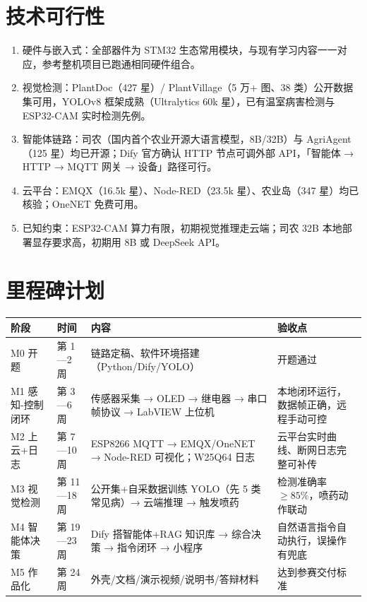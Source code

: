 \documentclass[11pt]{ctexart}
\begin{document}
\section{技术可行性}
\begin{enumerate}
  \item 硬件与嵌入式：全部器件为 STM32 生态常用模块，与现有学习内容一一对应，参考整机项目已跑通相同硬件组合。
  \item 视觉检测：PlantDoc（427 星）/ PlantVillage（5 万+ 图、38 类）公开数据集可用，YOLOv8 框架成熟（Ultralytics 60k 星），已有温室病害检测与 ESP32-CAM 实时检测先例。
  \item 智能体链路：司农（国内首个农业开源大语言模型，8B/32B）与 AgriAgent（125 星）均已开源；Dify 官方确认 HTTP 节点可调外部 API，「智能体 → HTTP → MQTT 网关 → 设备」路径可行。
  \item 云平台：EMQX（16.5k 星）、Node-RED（23.5k 星）、农业岛（347 星）均已核验；OneNET 免费可用。
  \item 已知约束：ESP32-CAM 算力有限，初期视觉推理走云端；司农 32B 本地部署显存要求高，初期用 8B 或 DeepSeek API。
\end{enumerate}

\section{里程碑计划}
\begin{longtable}{p{2.0cm}p{1.5cm}p{7.0cm}p{4.1cm}}
  \toprule
  阶段 & 时间 & 内容 & 验收点 \\
  \midrule
  M0 开题 & 第 1—2 周 & 链路定稿、软件环境搭建（Python/Dify/YOLO） & 开题通过 \\
  M1 感知-控制闭环 & 第 3—6 周 & 传感器采集 → OLED → 继电器 → 串口帧协议 → LabVIEW 上位机 & 本地闭环运行，数据帧正确，远程手动可控 \\
  M2 上云+日志 & 第 7—10 周 & ESP8266 MQTT → EMQX/OneNET → Node-RED 可视化；W25Q64 日志 & 云平台实时曲线、断网日志完整可补传 \\
  M3 视觉检测 & 第 11—18 周 & 公开集+自采数据训练 YOLO（先 5 类常见病）→ 云端推理 → 触发喷药 & 检测准确率 $\geq 85\%$，喷药动作联动 \\
  M4 智能体决策 & 第 19—23 周 & Dify 搭智能体+RAG 知识库 → 综合决策 → 指令闭环 → 小程序 & 自然语言指令自动执行，误操作有兜底 \\
  M5 作品化 & 第 24 周 & 外壳/文档/演示视频/说明书/答辩材料 & 达到参赛交付标准 \\
  \bottomrule
\end{longtable}
\end{document}
